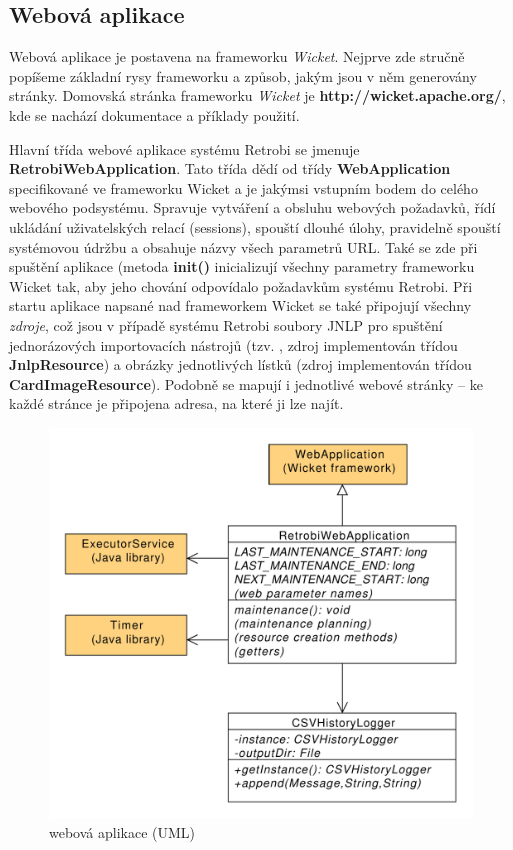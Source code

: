 \subsection{Webová aplikace}

Webová aplikace je postavena na frameworku {\em Wicket}. Nejprve zde stručně popíšeme základní rysy frameworku a způsob, jakým jsou v něm generovány stránky. Domovská stránka frameworku {\em Wicket} je {\bf http://wicket.apache.org/}, kde se nachází dokumentace a příklady použití. 

Hlavní třída webové aplikace systému Retrobi se jmenuje {\bf RetrobiWebApplication}. Tato třída dědí od třídy {\bf WebApplication} specifikované ve frameworku Wicket a je jakýmsi vstupním bodem do celého webového podsystému. Spravuje vytváření a obsluhu webových požadavků, řídí ukládání uživatelských relací (sessions), spouští dlouhé úlohy, pravidelně spouští systémovou údržbu a obsahuje názvy všech parametrů URL. Také se zde při spuštění aplikace (metoda {\bf init()} inicializují všechny parametry frameworku Wicket tak, aby jeho chování odpovídalo požadavkům systému Retrobi. Při startu aplikace napsané nad frameworkem Wicket se také připojují všechny {\em zdroje}, což jsou v případě systému Retrobi soubory JNLP pro spuštění jednorázových importovacích nástrojů (tzv. , zdroj implementován třídou {\bf JnlpResource}) a obrázky jednotlivých lístků (zdroj implementován třídou {\bf CardImageResource}). Podobně se mapují i jednotlivé webové stránky -- ke každé stránce je připojena  adresa, na které ji lze najít.

\begin{figure}
\label{fig:uml_application}
\centering
\includegraphics[width=.7\textwidth]{uml_application.pdf}
\caption{webová aplikace (UML)}
\end{figure}

